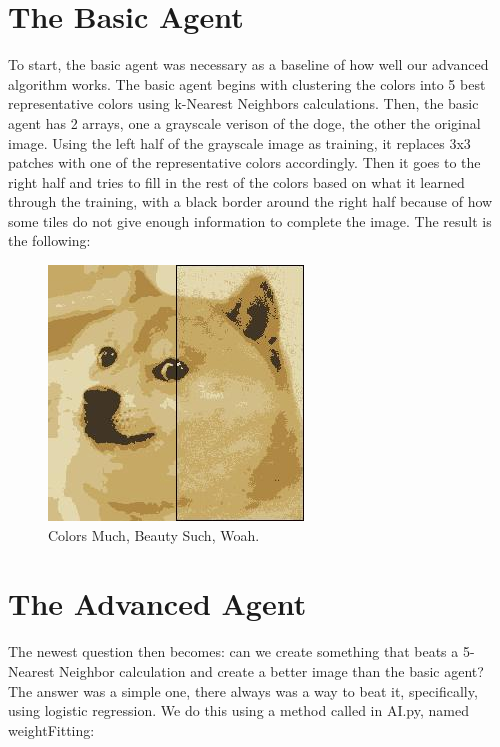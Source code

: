 \documentclass[11pt]{article}
\begin{document}
\section{The Basic Agent}
To start, the basic agent was necessary as a baseline of how well our advanced algorithm works. The basic agent begins with clustering the colors into 5 best representative colors using k-Nearest Neighbors calculations. Then, the basic agent has 2 arrays, one a grayscale verison of the doge, the other the original image. Using the left half of the grayscale image as training, it replaces 3x3 patches with one of the representative colors accordingly. Then it goes to the right half and tries to fill in the rest of the colors based on what it learned through the training, with a black border around the right half because of how some tiles do not give enough information to complete the image. The result is the following:

\begin{figure}[h]
\centering
\includegraphics[scale=0.80]{images/basic.jpg}
\caption{Colors Much, Beauty Such, Woah.}
\end{figure}

\section{The Advanced Agent}
The newest question then becomes: can we create something that beats a 5-Nearest Neighbor calculation and create a better image than the basic agent? The answer was a simple one, there always was a way to beat it, specifically, using logistic regression. We do this using a method called in AI.py, named weightFitting:
\end{document}
